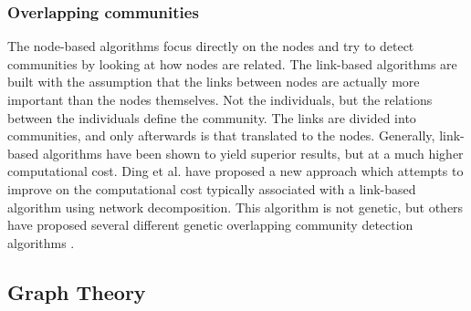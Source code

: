 \subsubsection{Overlapping communities}

The node-based algorithms focus directly on the nodes and try to detect communities by looking at how nodes are related. The link-based algorithms are built with the assumption that the links between nodes are actually more important than the nodes themselves. Not the individuals, but the relations between the individuals define the community. The links are divided into communities, and only afterwards is that translated to the nodes. Generally, link-based algorithms have been shown to yield superior results, but at a much higher computational cost. Ding et al. \cite{Ding2016} have proposed a new approach which attempts to improve on the computational cost typically associated with a link-based algorithm using network decomposition. This algorithm is not genetic,  but others have proposed several different genetic overlapping community detection algorithms \cite{linkclus2013, Pizzuti2009, Dickinson2013}.\\

\subsection{Graph Theory}
